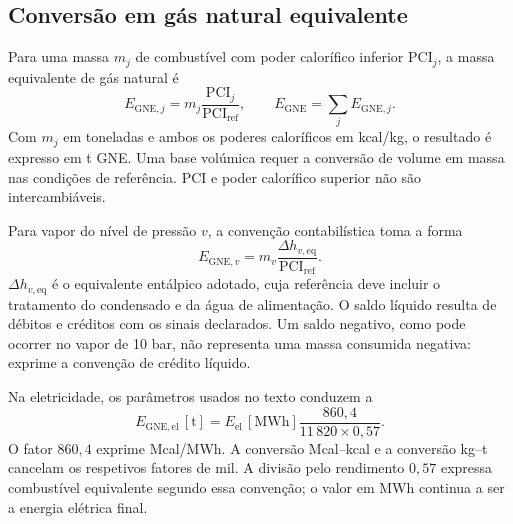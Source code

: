 \subsection{Conversão em gás natural equivalente}
\label{sec:mat-gne}
 Para uma massa $m_j$ de combustível com poder calorífico inferior $\mathrm{PCI}_j$, a massa equivalente de gás natural é
\begin{equation}
E_{\mathrm{GNE},j}=m_j\frac{\mathrm{PCI}_j}{\mathrm{PCI}_{\mathrm{ref}}},
\qquad E_{\mathrm{GNE}}=\sum_j E_{\mathrm{GNE},j}.
\label{eq:mat-gne-combustivel}
\end{equation}
Com $m_j$ em toneladas e ambos os poderes caloríficos em kcal/kg, o resultado é expresso em t GNE. Uma base volúmica requer a conversão de volume em massa nas condições de referência. PCI e poder calorífico superior não são intercambiáveis.

Para vapor do nível de pressão $v$, a convenção contabilística toma a forma
\begin{equation}
E_{\mathrm{GNE},v}=m_v\frac{\Delta h_{v,\mathrm{eq}}}{\mathrm{PCI}_{\mathrm{ref}}}.
\label{eq:mat-gne-vapor}
\end{equation}
$\Delta h_{v,\mathrm{eq}}$ é o equivalente entálpico adotado, cuja referência deve incluir o tratamento do condensado e da água de alimentação. O saldo líquido resulta de débitos e créditos com os sinais declarados. Um saldo negativo, como pode ocorrer no vapor de 10 bar, não representa uma massa consumida negativa: exprime a convenção de crédito líquido.

Na eletricidade, os parâmetros usados no texto conduzem a
\begin{equation}
E_{\mathrm{GNE,el}}\,[\mathrm{t}]
=E_{\mathrm{el}}\,[\mathrm{MWh}]
\frac{860{,}4}{11\,820\times0{,}57}.
\label{eq:mat-gne-eletricidade}
\end{equation}
O fator $860{,}4$ exprime Mcal/MWh. A conversão Mcal--kcal e a conversão kg--t cancelam os respetivos fatores de mil. A divisão pelo rendimento $0{,}57$ expressa combustível equivalente segundo essa convenção; o valor em MWh continua a ser a energia elétrica final.

